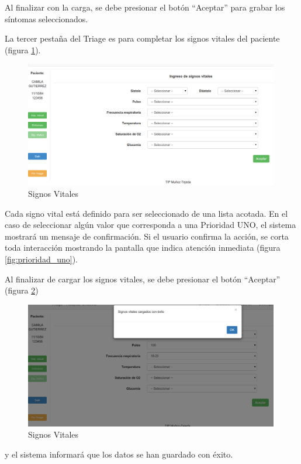 Al finalizar con la carga, se debe presionar el botón ``Aceptar'' para grabar los síntomas seleccionados.


La tercer pestaña del Triage es para completar los signos vitales del paciente (figura \ref{fig:signos_vitales}).
\begin{figure}
\centerline{\includegraphics[width=0.99\textwidth]{signos_vitales.png}}
\caption{Signos Vitales} \label{fig:signos_vitales}
\end{figure}
Cada signo vital está definido para ser seleccionado de una lista acotada. En el caso de seleccionar algún valor que corresponda a una Prioridad UNO, el sistema mostrará un mensaje de confirmación. Si el usuario confirma la acción, se corta toda interacción mostrando la pantalla que indica atención inmediata (figura \ref{fig:prioridad_uno}).

Al finalizar de cargar los signos vitales, se debe presionar el botón ``Aceptar'' (figura \ref{fig:signos_vitales_guardar})
\begin{figure}
\centerline{\includegraphics[width=0.99\textwidth]{signos_vitales_guardar.png}}
\caption{Signos Vitales} \label{fig:signos_vitales_guardar}
\end{figure}
y el sistema informará que los datos se han guardado con éxito.



